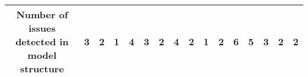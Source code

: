 \begin{table*}[]
\begin{adjustbox}{width=\textwidth,center}
\begin{tabular}{|cll|ccc|ccc|ccc|ccc|ccc|}
\multicolumn{3}{|c|}{\textbf{Number of issues detected in model structure}}                                                                                                                                                                                                                                                                                              & \multicolumn{1}{c|}{\textbf{3}}                                                                           & \multicolumn{1}{c|}{\textbf{2}}                                                                            & \textbf{1}                                                   & \multicolumn{1}{c|}{\textbf{4}}                                                                           & \multicolumn{1}{c|}{\textbf{3}}                                                                            & \textbf{2}                                                   & \multicolumn{1}{c|}{\textbf{4}}                                                                            & \multicolumn{1}{c|}{\textbf{2}}                                                                            & \textbf{1}                                                   & \multicolumn{1}{c|}{\textbf{2}}                                                                            & \multicolumn{1}{c|}{\textbf{6}}                                                                           & \textbf{5}                                                   & \multicolumn{1}{c|}{\textbf{3}}                                                                            & \multicolumn{1}{c|}{\textbf{2}}                                                                           & \textbf{2}                                                   \\ \hline

\end{tabular}
\end{adjustbox}
\end{table*}
